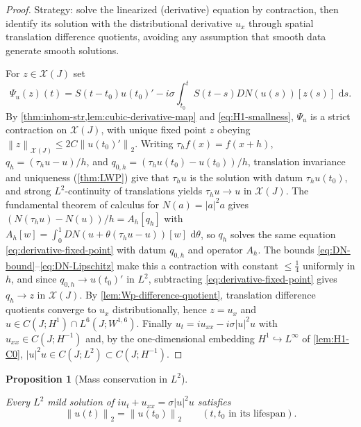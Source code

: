 \documentclass[11pt,oneside]{book}
\providecommand{\uses}[1]{}
\newtheorem{proposition}[theorem]{Proposition}
\theoremstyle{definition}
\theoremstyle{remark}
\newcommand{\1}{\mathbf 1}
\newcommand{\dd}{\,\mathrm d}
\newcommand{\norm}[1]{\left\lVert #1\right\rVert}
\begin{document}
\begin{proof}
\uses{thm:inhom-str, lem:cubic-derivative-map, lem:Wp-difference-quotient, lem:H1-C0}
Strategy: solve the linearized (derivative) equation by contraction, then
identify its solution with the distributional derivative $u_x$ through spatial
translation difference quotients, avoiding any assumption that smooth data
generate smooth solutions.

For $z\in\mathcal X(J)$ set
\begin{equation}
 \Psi_u(z)(t)=S(t-t_0)u(t_0)'
 -i\sigma\int_{t_0}^tS(t-s)DN(u(s))[z(s)]\,\dd s.  \label{eq:derivative-fixed-point}
\end{equation}
By \cref{thm:inhom-str,lem:cubic-derivative-map} and \eqref{eq:H1-smallness},
$\Psi_u$ is a strict contraction on $\mathcal X(J)$, with unique fixed point
$z$ obeying $\norm z_{\mathcal X(J)}\le 2C\norm{u(t_0)'}_2$. Writing
$\tau_hf(x)=f(x+h)$, $q_h=(\tau_hu-u)/h$, and $q_{0,h}=(\tau_hu(t_0)-u(t_0))/h$,
translation invariance and uniqueness (\cref{thm:LWP}) give that $\tau_hu$ is
the solution with datum $\tau_hu(t_0)$, and strong $L^2$-continuity of
translations yields $\tau_hu\to u$ in $\mathcal X(J)$. The fundamental theorem
of calculus for $N(a)=|a|^2a$ gives
$(N(\tau_hu)-N(u))/h=A_h[q_h]$ with
$A_h[w]=\int_0^1DN(u+\theta(\tau_hu-u))[w]\,\dd\theta$, so $q_h$ solves the
same equation \eqref{eq:derivative-fixed-point} with datum $q_{0,h}$ and
operator $A_h$. The bounds \eqref{eq:DN-bound}--\eqref{eq:DN-Lipschitz} make
this a contraction with constant $\le\tfrac14$ uniformly in $h$, and since
$q_{0,h}\to u(t_0)'$ in $L^2$, subtracting \eqref{eq:derivative-fixed-point}
gives $q_h\to z$ in $\mathcal X(J)$. By
\cref{lem:Wp-difference-quotient}, translation difference quotients converge
to $u_x$ distributionally, hence $z=u_x$ and
$u\in C(J;H^1)\cap L^6(J;W^{1,6})$. Finally
$u_t=iu_{xx}-i\sigma|u|^2u$ with $u_{xx}\in C(J;H^{-1})$ and, by the
one-dimensional embedding $H^1\hookrightarrow L^\infty$ of \cref{lem:H1-C0},
$|u|^2u\in C(J;L^2)\subset C(J;H^{-1})$.
\end{proof}

\begin{proposition}[Mass conservation in $L^2$]\label{prop:mass-L2}
\uses{thm:LWP}
Every $L^2$ mild solution of $iu_t+u_{xx}=\sigma|u|^2u$ satisfies
\begin{equation}
  \norm{u(t)}_2=\norm{u(t_0)}_2\qquad(t,t_0\text{ in its lifespan}).
  \label{eq:mass-conservation}
\end{equation}
\end{proposition}
\end{document}
